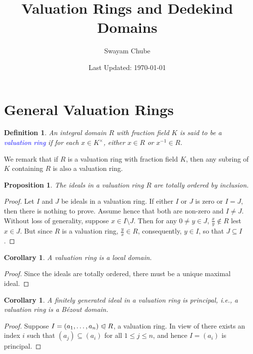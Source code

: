 \documentclass[11pt]{article}
\theoremstyle{thmstyle}
\newtheorem{proposition}[theorem]{Proposition}
\theoremstyle{defstyle}
\newtheorem{definition}[theorem]{Definition}
\newtheorem{corollary}[theorem]{Corollary}
\newcommand{\define}[1]{\textcolor{blue}{\textit{#1}}}
\renewcommand{\le}{\leqslant}
\newcommand{\noreq}{\trianglelefteqslant}
\begin{document}
\title{Valuation Rings and Dedekind Domains}
\author{Swayam Chube}
\date{Last Updated: \today}

\maketitle

\section{General Valuation Rings}

\begin{definition}
    An integral domain $R$ with fraction field $K$ is said to be a \define{valuation ring} if for each $x\in K^\times$, either $x\in R$ or $x^{-1}\in R$.
\end{definition}

We remark that if $R$ is a valuation ring with fraction field $K$, then any subring of $K$ containing $R$ is also a valuation ring.

\begin{proposition}
    The ideals in a valuation ring $R$ are totally ordered by inclusion.
\end{proposition}
\begin{proof}
    Let $I$ and $J$ be ideals in a valuation ring. If either $I$ or $J$ is zero or $I = J$, then there is nothing to prove. Assume hence that both are non-zero and $I\ne J$. Without loss of generality, suppose $x\in I\setminus J$. Then for any $0\ne y\in J$, $\frac{x}{y}\notin R$ lest $x\in J$. But since $R$ is a valuation ring, $\frac{y}{x}\in R$, consequently, $y\in I$, so that $J\subseteq I$.
\end{proof}

\begin{corollary}
    A valuation ring is a local domain.
\end{corollary}
\begin{proof}
    Since the ideals are totally ordered, there must be a unique maximal ideal.
\end{proof}

\begin{corollary}
    A finitely generated ideal in a valuation ring is principal, i.e., a valuation ring is a B\'ezout domain.
\end{corollary}
\begin{proof}
    Suppose $I = (a_1,\dots,a_n)\noreq R$, a valuation ring. In view of  there exists an index $i$ such that $(a_j)\subseteq(a_i)$ for all $1\le j\le n$, and hence $I = (a_i)$ is principal.
\end{proof}
\end{document}
